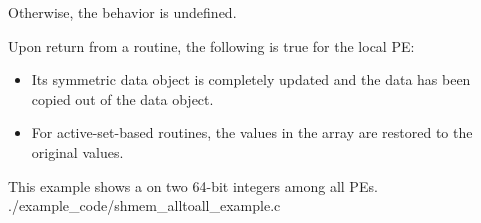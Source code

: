\begin{apidefinition}
{\begin{DeprecateBlock}
    Otherwise, the behavior is undefined.

    Upon return from a  routine, the following is true for
    the local \ac{PE}:
    \begin{itemize}
    	\item Its  symmetric data object is completely updated and the 
	data has been copied out of the  data object.
    	\item For active-set-based routines,
    	the values in the  array are restored to the original values.
    \end{itemize}
\end{DeprecateBlock}
}


\begin{apiexamples}

\apicexample
    {This \CorCpp{} example shows a  on two 64-bit integers among all
    \acp{PE}.}
    {./example_code/shmem_alltoall_example.c}
    {}

\end{apiexamples}

\end{apidefinition}

